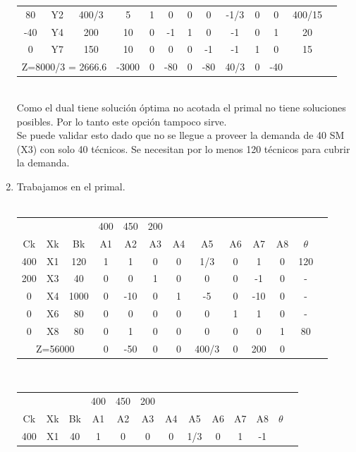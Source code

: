 \documentclass{article}
\begin{document}
\begin{enumerate}
\begin{tabular}{|c  c  c | c  c  c  c  c  c  c  c  c | c |}
			 80 & Y2 & 400/3 & 5 & 1 & 0 & 0 & 0 & -1/3 & 0 & 0 & 400/15\\
			 -40 & Y4 & 200 & 10 & 0 & -1 & 1 & 0 & -1 & 0 & 1 & 20\\
			 0 & Y7 & 150 & 10 & 0 & 0 & 0 & -1 & -1 & 1 & 0 & 15\\ \hline
			 \multicolumn{3}{|c|}{Z=8000/3 = 2666.6} & -3000 & 0 & -80 & 0 & -80 & 40/3 & 0 & -40 &\\ \hline
		\end{tabular}
		\medskip\\
	    Como el dual tiene soluci\'on \'optima no acotada el primal no tiene soluciones posibles. Por lo tanto este opci\'on tampoco sirve. 
     	\smallskip\\
	    Se puede validar esto dado que no se llegue a proveer la demanda de 40 SM (X3) con solo 40 t\'ecnicos. Se necesitan por lo menos 120 t\'ecnicos para cubrir la demanda.
		\medskip\\
	\item Trabajamos en el primal.\\
     	\smallskip\\
		\begin{tabular}{|c  c  c | c  c  c  c  c  c  c  c  c | c |}
			\hline
			 \multicolumn{3}{|c|}{} & 400 & 450 & 200 & & & & & & \\ 
			 Ck & Xk & Bk & A1 & A2 & A3 & A4 & A5 & A6 & A7 & A8 & $\theta$\\ \hline 
			 400 & X1 & 120 & 1 & 1 & 0 & 0 & 1/3 & 0 & 1 & 0 & 120\\
			 200 & X3 & 40 & 0 & 0 & 1 & 0 & 0 & 0  & -1 & 0 & -\\
			 0 & X4 & 1000 & 0 & -10 & 0 & 1 & -5 & 0 & -10 & 0 & -\\ 
			 0 & X6 & 80   & 0 & 0   & 0 & 0 & 0  & 1 & 1   & 0 & -\\
			 0 & X8 & 80   & 0 & 1   & 0 & 0 & 0  & 0 & 0   & 1 & 80\\ \hline
			 \multicolumn{3}{|c|}{Z=56000} & 0 & -50 & 0 & 0 & 400/3 & 0 & 200 & 0 &\\ \hline
		\end{tabular}
     	\smallskip\\
		\begin{tabular}{|c  c  c | c  c  c  c  c  c  c  c  c | c |}
			\hline
			 \multicolumn{3}{|c|}{} & 400 & 450 & 200 & & & & & & \\ 
			 Ck  & Xk & Bk   & A1 & A2 & A3 & A4 & A5 & A6 & A7 & A8 & $\theta$\\ \hline 
			 400 & X1 & 40  & 1  & 0   & 0 & 0 & 1/3 & 0  & 1   & -1    & \\

\end{tabular}
\end{enumerate}
\end{document}
